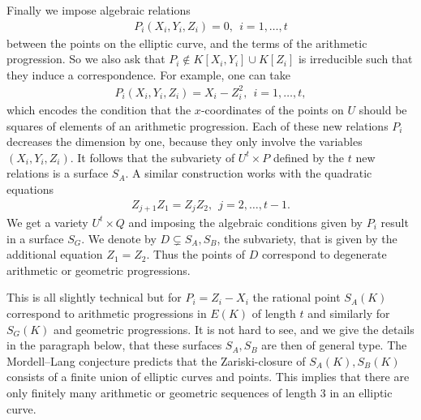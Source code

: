 \documentclass[12pt, reqno]{amsart}
\theoremstyle{remark}
\theoremstyle{definition}
\numberwithin{equation}{section}
\begin{document}
Finally we impose algebraic relations
\begin{align*}
    P_i(X_i, Y_i, Z_i) = 0, ~~ i = 1, \dots, t
\end{align*}
between the points on the elliptic curve, and the terms of the arithmetic progression. So we also ask that $P_i \notin K[X_i, Y_i]\cup K[Z_i]$ is irreducible such that they induce a correspondence. For example, one can take
\begin{align*}
    P_i(X_i, Y_i, Z_i) =
    X_i - Z_i^2,~~ i = 1, \dots, t,
\end{align*}
which encodes the condition that the $x$-coordinates of the points on $U$ should be squares of elements of an arithmetic progression. Each of these new relations $P_i$ decreases the dimension by one, because they only involve the variables $(X_i, Y_i, Z_i)$. It follows that the subvariety of $U^t \times P$ defined by the $t$ new relations is a surface $S_A$.
A similar construction works with the quadratic equations 
\begin{align}
    Z_{j + 1}Z_1= Z_jZ_2, ~~ j = 2, \dots, t-1.\label{geom} 
\end{align}
We get a variety $U^t \times Q$ and imposing the algebraic conditions given by $P_i$ result in a surface $S_G$.
We denote by $D \subsetneq S_A, S_B$, the subvariety, that is given by the additional equation $Z_1 = Z_2$. Thus the points of $D$ correspond to degenerate arithmetic or geometric progressions.

This is all slightly technical but for $P_i = Z_i - X_i$ the rational point $S_A(K)$ correspond to arithmetic progressions in $E(K)$ of length $t$ and similarly for $S_G(K)$ and geometric progressions. It is not hard to see, and we give the details in the paragraph below, that these surfaces $S_A, S_B$ are then of general type. The Mordell--Lang conjecture predicts that the Zariski-closure of $S_A(K), S_B(K)$ consists of a finite union of elliptic curves and points. This  implies that there are only finitely many arithmetic or geometric sequences of length 3 in an elliptic curve. 
\end{document}
